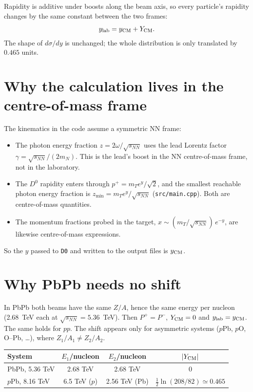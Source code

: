 \documentclass[11pt]{article}
\begin{document}
Rapidity is additive under boosts along the beam axis, so every particle's
rapidity changes by the same constant between the two frames:
\begin{equation}
  y_{\rm lab} = y_{\rm CM} + Y_{\rm CM}.
\end{equation}
The shape of $d\sigma/dy$ is unchanged; the whole distribution is only
translated by $0.465$ units.

\section{Why the calculation lives in the centre-of-mass frame}

The kinematics in the code assume a symmetric NN frame:
\begin{itemize}
  \item The photon energy fraction $z = 2\omega/\sqrt{s_{NN}}$ uses the lead
    Lorentz factor $\gamma = \sqrt{s_{NN}}/(2m_N)$. This is the lead's boost
    in the NN centre-of-mass frame, not in the laboratory.
  \item The $D^0$ rapidity enters through
    $p^+ = m_T e^{y}/\sqrt2$, and the smallest reachable photon energy
    fraction is $z_{\min} = m_T e^{y}/\sqrt{s_{NN}}$
    (\texttt{src/main.cpp}). Both are centre-of-mass quantities.
  \item The momentum fractions probed in the target,
    $x \sim (m_T/\sqrt{s_{NN}})\,e^{-y}$, are likewise centre-of-mass
    expressions.
\end{itemize}
So the $y$ passed to \texttt{D0} and written to the output files is
$y_{\rm CM}$.

\section{Why PbPb needs no shift}

In PbPb both beams have the same $Z/A$, hence the same energy per nucleon
(2.68~TeV each at $\sqrt{s_{NN}}=5.36$~TeV). Then $P^+=P^-$,
$Y_{\rm CM}=0$ and $y_{\rm lab}=y_{\rm CM}$. The same holds for $pp$. The
shift appears only for asymmetric systems ($p$Pb, $p$O, O--Pb, \dots), where
$Z_1/A_1 \neq Z_2/A_2$.

\begin{center}
\begin{tabular}{lccc}
\toprule
System & $E_1$/nucleon & $E_2$/nucleon & $|Y_{\rm CM}|$ \\
\midrule
PbPb, 5.36 TeV & 2.68 TeV & 2.68 TeV & 0 \\
$p$Pb, 8.16 TeV & 6.5 TeV ($p$) & 2.56 TeV (Pb) & $\tfrac12\ln(208/82)\simeq0.465$ \\
\bottomrule
\end{tabular}
\end{center}
\end{document}

